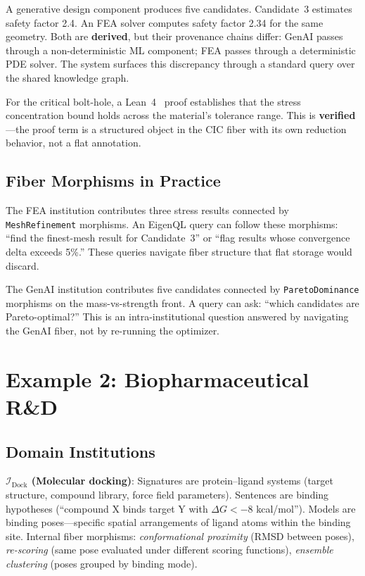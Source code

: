 \documentclass[10pt,twocolumn,letterpaper]{article}
\newcommand{\code}[1]{\texttt{\small #1}}
\begin{document}
A generative design component produces five candidates. Candidate~3 estimates safety factor 2.4. An FEA solver computes safety factor 2.34 for the same geometry. Both are \textbf{derived}, but their provenance chains differ: GenAI passes through a non-deterministic ML component; FEA passes through a deterministic PDE solver. The system surfaces this discrepancy through a standard query over the shared knowledge graph.

For the critical bolt-hole, a Lean~4~\cite{lean4} proof establishes that the stress concentration bound holds across the material's tolerance range. This is \textbf{verified}---the proof term is a structured object in the CIC fiber with its own reduction behavior, not a flat annotation.

\subsection{Fiber Morphisms in Practice}

The FEA institution contributes three stress results connected by \code{MeshRefinement} morphisms. An EigenQL query can follow these morphisms: ``find the finest-mesh result for Candidate~3'' or ``flag results whose convergence delta exceeds 5\%.'' These queries navigate fiber structure that flat storage would discard.

The GenAI institution contributes five candidates connected by \code{ParetoDominance} morphisms on the mass-vs-strength front. A query can ask: ``which candidates are Pareto-optimal?'' This is an intra-institutional question answered by navigating the GenAI fiber, not by re-running the optimizer.


\section{Example 2: Biopharmaceutical R\&D}
\label{sec:pharma}

\subsection{Domain Institutions}

\textbf{$\mathcal{I}_{\text{Dock}}$ (Molecular docking)}: Signatures are protein--ligand systems (target structure, compound library, force field parameters). Sentences are binding hypotheses (``compound X binds target Y with $\Delta G < -8$ kcal/mol''). Models are binding poses---specific spatial arrangements of ligand atoms within the binding site. Internal fiber morphisms: \emph{conformational proximity} (RMSD between poses), \emph{re-scoring} (same pose evaluated under different scoring functions), \emph{ensemble clustering} (poses grouped by binding mode).
\end{document}
